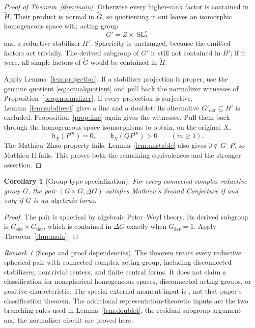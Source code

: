 \documentclass[11pt]{article}
\numberwithin{equation}{section}
\newtheorem{corollary}[theorem]{Corollary}
\theoremstyle{definition}
\theoremstyle{remark}
\newtheorem{remark}[theorem]{Remark}
\newcommand{\hX}{\mathfrak h_X}
\DeclareMathOperator{\SL}{SL}
\newcommand{\der}{\mathrm{der}}
\begin{document}
\begin{proof}[Proof of Theorem~\ref{thm:main}]
Otherwise every higher-rank factor is contained in $\widetilde H$. Their product is normal in $\widetilde G$, so quotienting it out leaves an isomorphic homogeneous space with acting group
\[
 G'=Z\times\SL_2^r
\]
and a reductive stabilizer $H'$. Sphericity is unchanged, because the omitted factors act trivially. The derived subgroup of $G'$ is still not contained in $H'$; if it were, all simple factors of $\widetilde G$ would be contained in $\widetilde H$.

Apply Lemma~\ref{lem:projection}. If a stabilizer projection is proper, use the genuine quotient \eqref{eq:actualquotient} and pull back the normalizer witnesses of Proposition~\ref{prop:normalizer}. If every projection is surjective, Lemma~\ref{lem:subdirect} gives a line and a doublet: its alternative $G'_{\der}\subseteq H'$ is excluded. Proposition~\ref{prop:line} again gives the witnesses. Pull them back through the homogeneous-space isomorphisms to obtain, on the original $X$,
\[
 \hX(P^m)=0,\qquad \hX(QP^m)>0\qquad(m\geq1).
\]
The Mathieu--Zhao property fails. Lemma~\ref{lem:unstable} also gives $0\notin\overline{G\cdot P}$, so Mathieu II fails. This proves both the remaining equivalences and the stronger assertion.
\end{proof}

\begin{corollary}[Group-type specialization]
For every connected complex reductive group $G$, the pair $(G\times G,\Delta G)$ satisfies Mathieu's Second Conjecture if and only if $G$ is an algebraic torus.
\end{corollary}
\begin{proof}
The pair is spherical by algebraic Peter--Weyl theory. Its derived subgroup is $G_{\der}\times G_{\der}$, which is contained in $\Delta G$ exactly when $G_{\der}=1$. Apply Theorem~\ref{thm:main}.
\end{proof}

\begin{remark}[Scope and proof dependencies]
The theorem treats every reductive spherical pair with connected complex acting group, including disconnected stabilizers, nontrivial centers, and finite central forms. It does not claim a classification for nonspherical homogeneous spaces, disconnected acting groups, or positive characteristic. The special external moment input is \cite[Theorem~4.1]{Long}, not that paper's classification theorem. The additional representation-theoretic inputs are the two branching rules used in Lemma~\ref{lem:doublet}; the residual subgroup argument and the normalizer circuit are proved here.
\end{remark}
\end{document}
